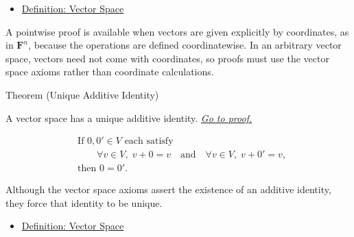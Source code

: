 \begin{dependencies}
\begin{itemize}
  \item \hyperref[def:vector-space]{Definition: Vector Space}
\end{itemize}
\end{dependencies}

\begin{remark*}
A pointwise proof is available when vectors are given explicitly by coordinates, as in $\mathbf{F}^n$, because the operations are defined coordinatewise. In an arbitrary vector space, vectors need not come with coordinates, so proofs must use the vector space axioms rather than coordinate calculations.
\end{remark*}


\begin{theorembox}{Theorem (Unique Additive Identity)}
\begin{theorem}
\label{thm:unique-additive-identity}
A vector space has a unique additive identity.
\hyperref[prf:unique-additive-identity]{\textit{Go to proof.}}
\end{theorem}
\end{theorembox}

\begin{remark*}
\[
\begin{aligned}
&\text{If } 0,0' \in V \text{ each satisfy} \\
&\qquad \forall v \in V,\; v+0=v
\quad\text{and}\quad
\forall v \in V,\; v+0'=v, \\
&\text{then } 0=0'.
\end{aligned}
\]
\end{remark*}

\begin{remark*}[Interpretation]
Although the vector space axioms assert the existence of an additive identity,
they force that identity to be unique.
\end{remark*}

\begin{dependencies}
\begin{itemize}
  \item \hyperref[def:vector-space]{Definition: Vector Space}
\end{itemize}
\end{dependencies}

